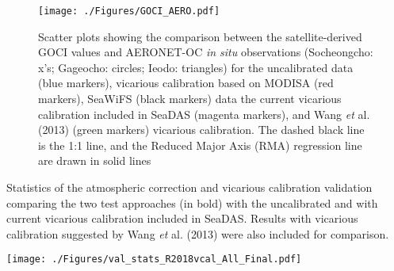 \documentclass[]{interact}
\theoremstyle{plain}%
\theoremstyle{definition}
\theoremstyle{remark}
\begin{document}
\begin{figure}[htbp!]
  \centering
    \texttt{[image: ./Figures/GOCI\_AERO.pdf]}

    \caption{Scatter plots showing the comparison between the satellite-derived GOCI values and AERONET-OC {\it in situ} observations (Socheongcho: x's; Gageocho: circles; Ieodo: triangles) for the uncalibrated data (blue markers), vicarious calibration based on MODISA (red markers), SeaWiFS (black markers) data the current vicarious calibration included in SeaDAS (magenta markers), and Wang {\it et} al. (2013) \citep{Wang:13} (green markers) vicarious calibration. The dashed black line is the 1:1 line, and the Reduced Major Axis (RMA) regression line are drawn in solid lines \label{fig:GOCI_AERO} } 
\end{figure}
\begin{table}[H]
\caption{Statistics of the atmospheric correction and vicarious calibration validation comparing the two test approaches (in bold) with the uncalibrated and with current vicarious calibration included in SeaDAS. Results with vicarious calibration suggested by Wang {\it et} al. (2013) \citep{Wang:13} were also included for comparison. \label{tab:val_stats} }

  \centering
    \texttt{[image: ./Figures/val\_stats\_R2018vcal\_All\_Final.pdf]}

\end{table}
\end{document}
